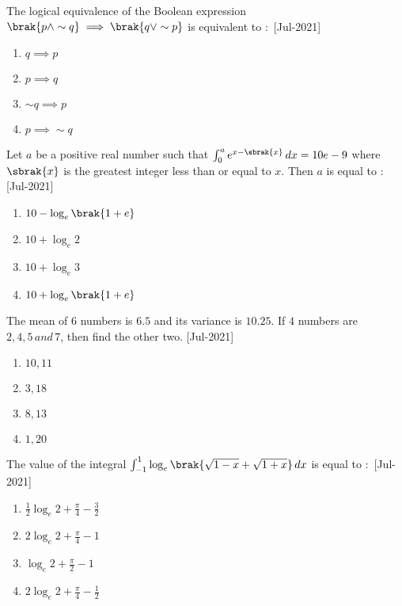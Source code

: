 \iffalse
\title{2021}
\author{EE24BTECH11021}
\section{mcq-single}
\fi
    \item The logical equivalence of the Boolean expression $\brak{p\wedge\sim q}\implies \brak{q\vee \sim p}$ is equivalent to $\colon$
    \hfill{[Jul-2021]}
        \begin{enumerate}
            \item $q\implies p$
            \item $p\implies q$
            \item $\sim q\implies p$
            \item $p\implies \sim q$
        \end{enumerate}
    \item Let $a$ be a positive real number such that $\int_{0}^{a}e^{x-\sbrak{x}} \, dx=10e-9$ where $\sbrak{x}$ is the greatest integer less than or equal to $x$. Then $a$ is equal to $\colon$
    \hfill{[Jul-2021]}
        \begin{enumerate}
            \item $10-\log_{e}\brak{1+e}$
            \item $10+\log_{e}2$
            \item $10+\log_{e}3$
            \item $10+\log_{e}\brak{1+e}$
        \end{enumerate}
    \item The mean of $6$ numbers is $6.5$ and its variance is $10.25$. If $4$ numbers are $2,4,5\, and\, 7$, then find the other two.
    \hfill{[Jul-2021]}
        \begin{enumerate}
            \item $10,11$
            \item $3,18$
            \item $8,13$
            \item $1,20$
        \end{enumerate}
    \item The value of the integral $\int_{-1}^{1}\log_{e}\brak{\sqrt{1-x}+\sqrt{1+x}} \, dx$ is equal to $\colon$
    \hfill{[Jul-2021]}
        \begin{enumerate}
            \item $\frac{1}{2}\log_{e}2+\frac{\pi}{4}-\frac{3}{2}$
            \item $2\log_{e}2+\frac{\pi}{4}-1$
            \item $\log_{e}2+\frac{\pi}{2}-1$
            \item $2\log_{e}2+\frac{\pi}{4}-\frac{1}{2}$
        \end{enumerate}
